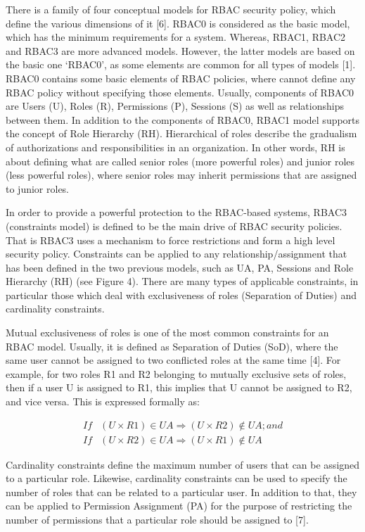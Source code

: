 There is a family of four conceptual models for RBAC security policy, which define the various dimensions of it [6].  RBAC0 is considered as the basic model, which has the minimum requirements for a system.  Whereas, RBAC1, RBAC2 and RBAC3 are more advanced models.  However, the latter models are based on the basic one ‘RBAC0’, as some elements are common for all types of models [1].
     RBAC0 contains some basic elements of RBAC policies, where cannot define any RBAC policy without specifying those elements.  Usually, components of RBAC0 are Users (U), Roles (R), Permissions (P), Sessions (S) as well as relationships between them.  
In addition to the components of RBAC0, RBAC1 model supports the concept of Role Hierarchy (RH).  Hierarchical of roles describe the gradualism of authorizations and responsibilities in an organization.  In other words, RH is about defining what are called senior roles (more powerful roles) and junior roles (less powerful roles), where senior roles may inherit permissions that are assigned to junior roles.

      In order to provide a powerful protection to the RBAC-based systems, RBAC3 (constraints model) is defined to be the main drive of RBAC security policies.  That is RBAC3 uses a mechanism to force restrictions and form a high level security policy.  Constraints can be applied to any relationship/assignment that has been defined in the two previous models, such as UA, PA, Sessions and Role Hierarchy (RH) (see Figure 4).  There are many types of applicable constraints, in particular those which deal with exclusiveness of roles (Separation of Duties) and cardinality constraints.
      
      Mutual exclusiveness of roles is one of the most common constraints for an RBAC model.  Usually, it is defined as Separation of Duties (SoD), where the same user cannot be assigned to two conflicted roles at the same time [4].  For example, for two roles R1 and R2 belonging to mutually exclusive sets of roles, then if a user U is assigned to R1, this implies that U cannot be assigned to R2, and vice versa.  This is expressed formally as:
  
 
      \begin{align*} 
       If&  (U \times R1) \in UA \Rightarrow  (U \times R2) \notin UA ;     and \\
       If&  (U \times R2) \in UA \Rightarrow (U \times R1) \notin UA
      \end{align*}    
 
      
      Cardinality constraints define the maximum number of users that can be assigned to a particular role.  Likewise, cardinality constraints can be used to specify the number of roles that can be related to a particular user.  In addition to that, they can be applied to Permission Assignment (PA) for the purpose of restricting the number of permissions that a particular role should be assigned to [7].


